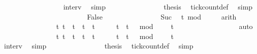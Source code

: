 \begin{isabellebody}
\ \ \ \ \ \ \ \ \ \ \ \ \ \ \ \ \isamarkupfalse%
\ interv{\isacharunderscore}{}\ \isamarkupfalse%
\ simp\isanewline
\ \ \ \ \ \ \ \ \ \ \ \ \ \ \isamarkupfalse%
\ {\isacharquery}thesis\ \isamarkupfalse%
\ tick{\isacharunderscore}count{\isacharunderscore}def\ \isamarkupfalse%
\ simp\isanewline
\ \ \ \ \ \ \ \ \ \ \isamarkupfalse%
\isanewline
\ \ \ \ \ \ \ \ \ \ \ \ \isamarkupfalse%
\ False\isanewline
\ \ \ \ \ \ \ \ \ \ \ \ \ \ \isamarkupfalse%
\ Suc\ \isamarkupfalse%
\ {\isacartoucheopen}t\ mod\ {}\ {\isacharequal}\ {}{\isacartoucheclose}\ \isamarkupfalse%
\ arith\isanewline
\ \ \ \ \ \ \ \ \ \ \ \ \ \ \isamarkupfalse%
\ {\isacartoucheopen}{\isacharbraceleft}t{\isachardot}\ {\isacharparenleft}t\ {\isacharequal}\ t\ {\isasymor}\ t\ {\isacharequal}\ t\ {\isacharplus}\ {}{\isacharparenright}\ {\isasymand}\ {}\ {\isasymle}\ t\ {\isasymand}\ {\isacharparenleft}t\ {\isacharminus}\ {}{\isacharparenright}\ mod\ {}\ {\isacharequal}\ {}{\isacharbraceright}\ {\isacharequal}\ {\isacharbraceleft}t\isanewline
\ \ \ \ \ \ \ \ \ \ \ \ \ \ \ \ \isamarkupfalse%
\ auto\ \isanewline
\ \ \ \ \ \ \ \ \ \ \ \ \ \ \isamarkupfalse%
\ {\isacartoucheopen}{\isacharbraceleft}t{\isachardot}\ t\ {\isasymle}\ t\ {\isasymand}\ t\ {\isacharless}\ t\ {\isacharplus}\ {}\ {\isasymand}\ {}\ {\isasymle}\ t\ {\isasymand}\ {\isacharparenleft}t\ {\isacharminus}\ {}{\isacharparenright}\ mod\ {}\ {\isacharequal}\ {}{\isacharbraceright}\ {\isacharequal}\ {\isacharbraceleft}t\isanewline
\ \ \ \ \ \ \ \ \ \ \ \ \ \ \ \ \isamarkupfalse%
\ interv{\isacharunderscore}{}\ \isamarkupfalse%
\ simp\isanewline
\ \ \ \ \ \ \ \ \ \ \ \ \ \ \isamarkupfalse%
\ {\isacharquery}thesis\ \isamarkupfalse%
\ tick{\isacharunderscore}count{\isacharunderscore}def\ \isamarkupfalse%
\ simp\isanewline
\ \ \ \ \ \ \ \ \ \ \isamarkupfalse%

\end{isabellebody}
